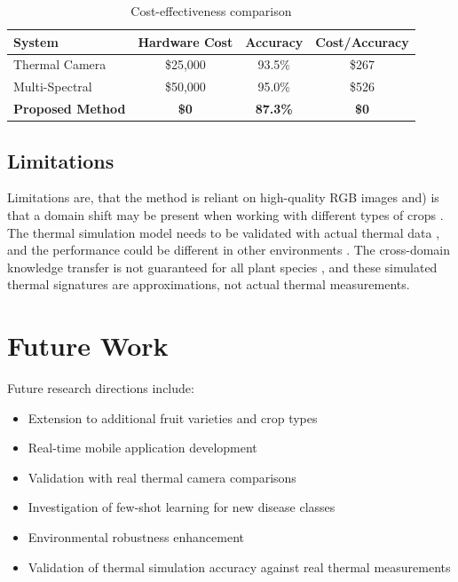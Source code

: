 \documentclass[conference]{IEEEtran}
\begin{document}
\begin{table}[!t]
    \centering
    \caption{Cost-effectiveness comparison}
    \label{tab:cost}
    \footnotesize
    \begin{tabular}{lccc}
        \toprule
        \textbf{System} & \textbf{Hardware Cost} & \textbf{Accuracy} & \textbf{Cost/Accuracy} \\
        \midrule
        Thermal Camera & \$25,000 & 93.5\% & \$267 \\
        Multi-Spectral & \$50,000 & 95.0\% & \$526 \\
        \textbf{Proposed Method} & \textbf{\$0} & \textbf{87.3\%} & \textbf{\$0} \\
        \bottomrule
    \end{tabular}
\end{table}

\subsection{Limitations}
Limitations are, that the method is reliant on high-quality RGB images and) is that a domain shift may be present when working with different types of crops \cite{kouidri2021}. The thermal simulation model needs to be validated with actual thermal data \cite{zhai2020}, and the performance could be different in other environments \cite{furbank2011}. The cross-domain knowledge transfer is not guaranteed for all plant species \cite{weiss2016}, and these simulated thermal signatures are approximations, not actual thermal measurements. 

\section{Future Work}
Future research directions include:
\begin{itemize}
    \item Extension to additional fruit varieties and crop types
    \item Real-time mobile application development
    \item Validation with real thermal camera comparisons
    \item Investigation of few-shot learning for new disease classes
    \item Environmental robustness enhancement
    \item Validation of thermal simulation accuracy against real thermal measurements
\end{itemize}
\end{document}
